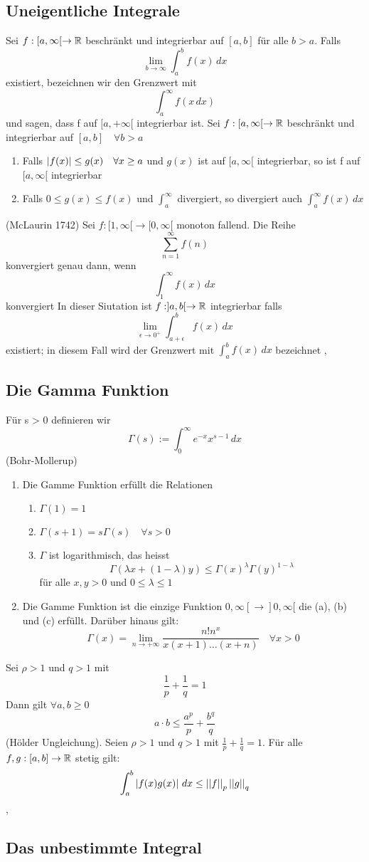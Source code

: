 \subsection{Uneigentliche Integrale}
 Sei \(f:[a, \infty[ \rightarrow \mathbb{R} \) beschränkt und integrierbar auf \([a,b]\) für alle \( b > a\). Falls
\[ \lim\limits_{b \rightarrow \infty} \int_{a}^{b} f(x) \,dx \]
existiert, bezeichnen wir den Grenzwert mit
\[ \int_{a}^{\infty} f(x \,dx )\]
und sagen, dass f auf \([a, +\infty[ \) integrierbar ist.
 Sei \(f:[a, \infty [ \rightarrow \mathbb{R} \) beschränkt und integrierbar auf \([a,b] \quad \forall b > a\)
\begin{enumerate}
    \item [1] Falls \( \left\lvert f(x) \right\rvert \leq g(x) \quad \forall x \geq a \) und \(g(x)\) ist auf \([a, \infty[ \) integrierbar, so ist f auf \([a, \infty[ \) integrierbar
    \item [2] Falls \( 0 \leq g(x) \leq f(x)\) und \(\int_{a}^{\infty}\) divergiert, so divergiert auch \( \int_{a}^{\infty} f(x) \,dx \)
\end{enumerate}
 (McLaurin 1742) Sei \(f : [1 , \infty[ \rightarrow [0, \infty[ \) monoton fallend. Die Reihe
\[ \sum_{n=1}^{\infty} f(n)\]
konvergiert genau dann, wenn
\[ \int_{1}^{\infty} f(x) \,dx \]
konvergiert
 In dieser Siutation ist \( f: ]a,b[ \rightarrow \mathbb{R} \) integrierbar falls
\[ \lim\limits_{\epsilon \rightarrow 0^{+}} \int_{a + \epsilon}^{b} f(x) \,dx \]
existiert; in diesem Fall wird der Grenzwert mit \(\int_{a}^{b} f(x) \,dx \) bezeichnet
\sep
\subsection{Die Gamma Funktion}
 Für s > 0 definieren wir
\[ \Gamma(s) := \int_{0}^{\infty} e^{-x}x^{s-1} \,dx\]
(Bohr-Mollerup)
\begin{enumerate}
    \item [1] Die Gamme Funktion erfüllt die Relationen
    \begin{enumerate}
        \item [(a)] \( \Gamma(1) = 1\)
        \item [(b)] \(\Gamma(s+1) = s\Gamma(s) \quad \forall s > 0 \)
        \item [(c)] \( \Gamma\) ist logarithmisch, das heisst
        \[\Gamma( \lambda x + (1 - \lambda)y) \leq \Gamma(x)^{\lambda}\Gamma(y)^{1-\lambda}\]
        für alle \(x,y > 0\) und \(0 \leq \lambda \leq 1\)
    \end{enumerate}
    \item [2] Die Gamme Funktion ist die einzige Funktion \( 0, \infty[ \rightarrow ]0, \infty [\) die (a), (b) und (c) erfüllt. Darüber hinaus gilt:
    \[\Gamma(x) = \lim\limits_{n \rightarrow +\infty} \frac{n!n^x}{x(x+1) \dots (x+n)} \quad \forall x > 0\] 
\end{enumerate}
 Sei \( \rho > 1\) und \(q > 1\) mit
\[ \frac{1}{p} + \frac{1}{q} = 1\]
Dann gilt \(\forall a,b \geq 0 \)
\[ a \cdot b \leq \frac{a^p}{p} + \frac{b^q}{q}\]
(Hölder Ungleichung). Seien \( \rho > 1\) und \( q > 1\) mit \( \frac{1}{p} + \frac{1}{q} = 1\). Für alle \(f,g : [a,b] \rightarrow \mathbb{R} \) stetig gilt:
\[ \int_{a}^{b} \left\lvert f(x)g(x) \right\rvert \,dx \leq \left\lvert \left\lvert f \right\rvert \right\rvert_p \left\lvert \left\lvert g \right\rvert \right\rvert_q\]
\sep
\subsection{Das unbestimmte Integral}
